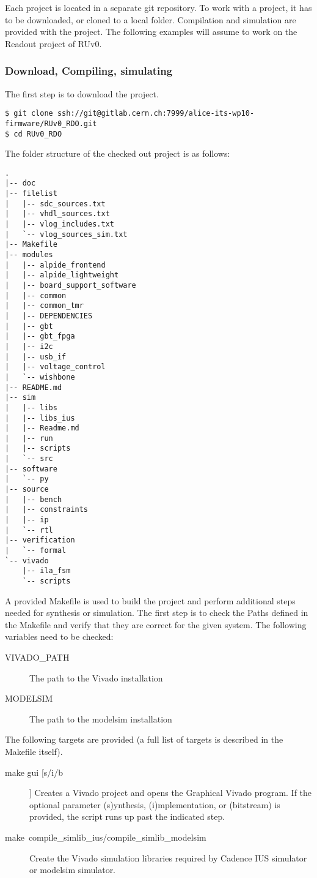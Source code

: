 \documentclass{scrartcl}
\begin{document}
Each project is located in a separate git repository. To work with a
project, it has to be downloaded, or cloned to a local
folder. Compilation and simulation are provided with the project. The
following examples will assume to work on the Readout project of RUv0.

\subsubsection{Download, Compiling, simulating}
The first step is to download the project.

\begin{verbatim}
$ git clone ssh://git@gitlab.cern.ch:7999/alice-its-wp10-firmware/RUv0_RDO.git
$ cd RUv0_RDO
\end{verbatim}

The folder structure of the checked out project is as follows:
\begin{verbatim}
.
|-- doc
|-- filelist
|   |-- sdc_sources.txt
|   |-- vhdl_sources.txt
|   |-- vlog_includes.txt
|   `-- vlog_sources_sim.txt
|-- Makefile
|-- modules
|   |-- alpide_frontend
|   |-- alpide_lightweight
|   |-- board_support_software
|   |-- common
|   |-- common_tmr
|   |-- DEPENDENCIES
|   |-- gbt
|   |-- gbt_fpga
|   |-- i2c
|   |-- usb_if
|   |-- voltage_control
|   `-- wishbone
|-- README.md
|-- sim
|   |-- libs
|   |-- libs_ius
|   |-- Readme.md
|   |-- run
|   |-- scripts
|   `-- src
|-- software
|   `-- py
|-- source
|   |-- bench
|   |-- constraints
|   |-- ip
|   `-- rtl
|-- verification
|   `-- formal
`-- vivado
    |-- ila_fsm
    `-- scripts
\end{verbatim}

A provided Makefile is used to build the project and perform
additional steps needed for synthesis or simulation. The first step is
to check the Paths defined in the Makefile and verify that they are
correct for the given system. The following variables need to be
checked:

\begin{description}
\item [VIVADO\_PATH] The path to the Vivado installation
\item [MODELSIM] The path to the modelsim installation
\end{description}

The following targets are provided (a full list of targets is
described in the Makefile itself).

\begin{description}
\item[make gui [s/i/b]] Creates a Vivado project and opens the
  Graphical Vivado program. If the optional parameter (s)ynthesis,
  (i)mplementation, or (bitstream) is provided, the script runs up
  past the indicated step.
\item[make\ compile\_simlib\_ius/compile\_simlib\_modelsim] Create the
  Vivado simulation libraries required by Cadence IUS simulator or modelsim
  simulator.
\end{description}
\end{document}
